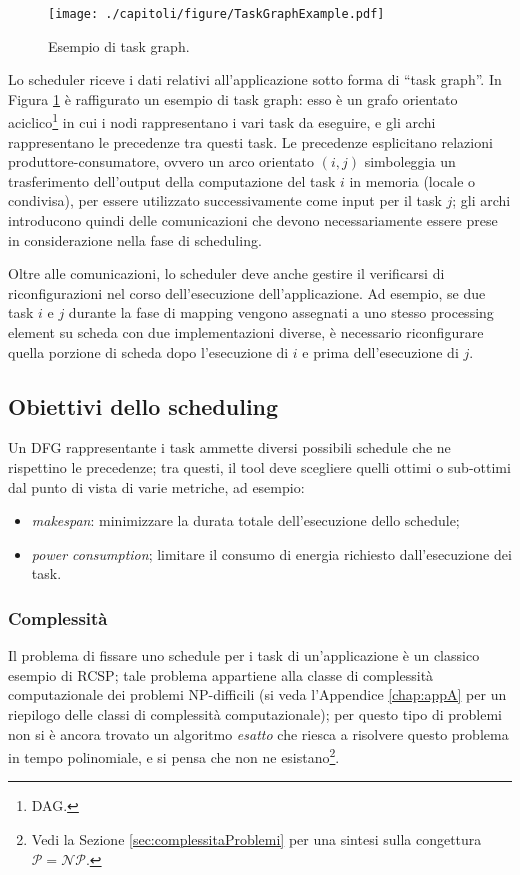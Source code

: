 \begin{figure}[ht]
 \begin{center}
 \texttt{[image: ./capitoli/figure/TaskGraphExample.pdf]}
 \caption{Esempio di task graph.}
 \label{fig:taskGraphExample}
 \end{center}
\end{figure}

Lo scheduler riceve i dati relativi all'applicazione sotto forma di ``task graph''.
In Figura \ref{fig:taskGraphExample} è raffigurato un esempio di task graph: esso è un 
grafo orientato aciclico\footnote{\ac{DAG}.} in cui i nodi rappresentano i vari task da 
eseguire, e gli archi rappresentano le precedenze tra questi task.
Le precedenze esplicitano relazioni produttore-consumatore, ovvero un arco orientato 
$(i,j)$ simboleggia un trasferimento dell'output della computazione del task $i$ in 
memoria (locale o condivisa), per essere utilizzato successivamente come input per il 
task $j$; gli archi introducono quindi delle comunicazioni che devono necessariamente 
essere prese in considerazione nella fase di scheduling.

Oltre alle comunicazioni, lo scheduler deve anche gestire il verificarsi di 
riconfigurazioni nel corso dell'esecuzione dell'applicazione. Ad esempio, se due task $i$ 
e $j$ durante la fase di mapping vengono assegnati a uno stesso processing element su 
scheda con due implementazioni diverse, è necessario riconfigurare quella porzione di 
scheda dopo l'esecuzione di $i$ e prima dell'esecuzione di $j$.

\subsection{Obiettivi dello scheduling}
Un \ac{DFG} rappresentante i task ammette diversi possibili schedule che ne rispettino le 
precedenze; tra questi, il tool deve scegliere quelli ottimi o sub-ottimi dal punto di 
vista di varie metriche, ad esempio:
\begin{itemize}
 \item \emph{makespan}: minimizzare la durata totale dell'esecuzione dello schedule;
 \item \emph{power consumption}; limitare il consumo di energia richiesto 
dall'esecuzione dei task.
\end{itemize}


\subsubsection{Complessità}
Il problema di fissare uno schedule per i task di un'applicazione è un classico esempio 
di \ac{RCSP}; tale problema appartiene alla classe di complessità computazionale dei 
problemi NP-difficili (si veda l'Appendice \ref{chap:appA} per un riepilogo delle classi 
di complessità computazionale); per questo tipo di problemi non si è ancora trovato un 
algoritmo \emph{esatto} che riesca a risolvere questo problema in tempo 
polinomiale, e si pensa che non ne esistano\footnote{Vedi la Sezione 
\ref{sec:complessitaProblemi} per una sintesi sulla congettura $\mathcal{P} = 
\mathcal{NP}$.}.

